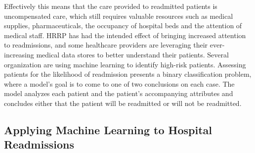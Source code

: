 \documentclass[sigconf]{acmart}
\begin{document}
Effectively this means that the care provided to readmitted patients is uncompensated care, which still requires valuable resources such as medical supplies, pharmaceuticals, the occupancy of hospital beds and the attention of medical staff. HRRP has had the intended effect of bringing increased attention to readmissions, and some healthcare providers are leveraging their ever-increasing medical data stores to better understand their patients. Several organization are using machine learning to identify high-risk patients. Assessing patients for the likelihood of readmission presents a binary classification problem, where a model's goal is to come to one of two conclusions on each case. The model analyzes each patient and the patient's accompanying attributes and concludes either that the patient will be readmitted or will not be readmitted.

\subsection{Applying Machine Learning to Hospital Readmissions}
\end{document}
